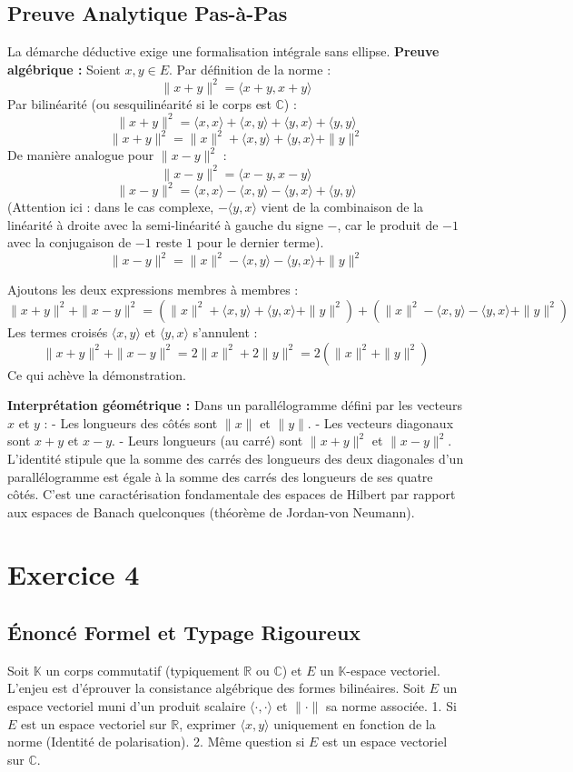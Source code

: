 \documentclass[11pt,a4paper]{report}
\begin{document}
\subsection*{Preuve Analytique Pas-à-Pas}
La démarche déductive exige une formalisation intégrale sans ellipse.
\textbf{Preuve algébrique :}
Soient $x, y \in E$. Par définition de la norme :
$$\|x + y\|^2 = \langle x + y, x + y \rangle$$
Par bilinéarité (ou sesquilinéarité si le corps est $\mathbb{C}$) :
$$\|x + y\|^2 = \langle x, x \rangle + \langle x, y \rangle + \langle y, x \rangle + \langle y, y \rangle$$
$$\|x + y\|^2 = \|x\|^2 + \langle x, y \rangle + \langle y, x \rangle + \|y\|^2$$
De manière analogue pour $\|x - y\|^2$ :
$$\|x - y\|^2 = \langle x - y, x - y \rangle$$
$$\|x - y\|^2 = \langle x, x \rangle - \langle x, y \rangle - \langle y, x \rangle + \langle y, y \rangle$$
(Attention ici : dans le cas complexe, $-\langle y, x \rangle$ vient de la combinaison de la linéarité à droite avec la semi-linéarité à gauche du signe $-$, car le produit de $-1$ avec la conjugaison de $-1$ reste $1$ pour le dernier terme).
$$\|x - y\|^2 = \|x\|^2 - \langle x, y \rangle - \langle y, x \rangle + \|y\|^2$$

Ajoutons les deux expressions membres à membres :
$$\|x + y\|^2 + \|x - y\|^2 = (\|x\|^2 + \langle x, y \rangle + \langle y, x \rangle + \|y\|^2) + (\|x\|^2 - \langle x, y \rangle - \langle y, x \rangle + \|y\|^2)$$
Les termes croisés $\langle x, y \rangle$ et $\langle y, x \rangle$ s'annulent :
$$\|x + y\|^2 + \|x - y\|^2 = 2\|x\|^2 + 2\|y\|^2 = 2(\|x\|^2 + \|y\|^2)$$
Ce qui achève la démonstration.

\textbf{Interprétation géométrique :}
Dans un parallélogramme défini par les vecteurs $x$ et $y$ :
- Les longueurs des côtés sont $\|x\|$ et $\|y\|$.
- Les vecteurs diagonaux sont $x+y$ et $x-y$.
- Leurs longueurs (au carré) sont $\|x+y\|^2$ et $\|x-y\|^2$.
L'identité stipule que la somme des carrés des longueurs des deux diagonales d'un parallélogramme est égale à la somme des carrés des longueurs de ses quatre côtés. C'est une caractérisation fondamentale des espaces de Hilbert par rapport aux espaces de Banach quelconques (théorème de Jordan-von Neumann).


\section{Exercice 4}


\subsection*{Énoncé Formel et Typage Rigoureux}
Soit $\mathbb{K}$ un corps commutatif (typiquement $\mathbb{R}$ ou $\mathbb{C}$) et $E$ un $\mathbb{K}$-espace vectoriel. L'enjeu est d'éprouver la consistance algébrique des formes bilinéaires.
Soit $E$ un espace vectoriel muni d'un produit scalaire $\langle \cdot, \cdot \rangle$ et $\| \cdot \|$ sa norme associée.
1. Si $E$ est un espace vectoriel sur $\mathbb{R}$, exprimer $\langle x, y \rangle$ uniquement en fonction de la norme (Identité de polarisation).
2. Même question si $E$ est un espace vectoriel sur $\mathbb{C}$.
\end{document}
